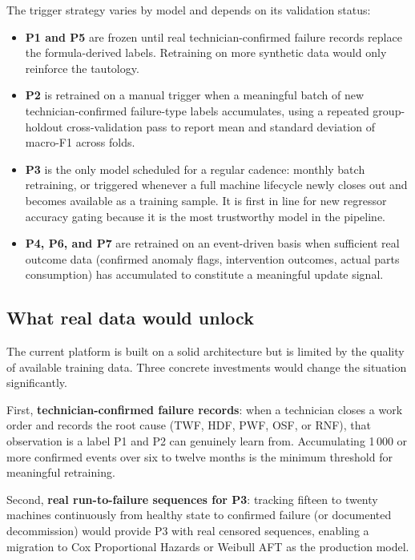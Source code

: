 The trigger strategy varies by model and depends on its validation status:

\begin{itemize}
\item \textbf{P1 and P5} are frozen until real technician-confirmed failure records replace the formula-derived labels. Retraining on more synthetic data would only reinforce the tautology.
\item \textbf{P2} is retrained on a manual trigger when a meaningful batch of new technician-confirmed failure-type labels accumulates, using a repeated group-holdout cross-validation pass to report mean and standard deviation of macro-F1 across folds.
\item \textbf{P3} is the only model scheduled for a regular cadence: monthly batch retraining, or triggered whenever a full machine lifecycle newly closes out and becomes available as a training sample. It is first in line for new regressor accuracy gating because it is the most trustworthy model in the pipeline.
\item \textbf{P4, P6, and P7} are retrained on an event-driven basis when sufficient real outcome data (confirmed anomaly flags, intervention outcomes, actual parts consumption) has accumulated to constitute a meaningful update signal.
\end{itemize}

\subsection{What real data would unlock}

The current platform is built on a solid architecture but is limited by the quality of available training data. Three concrete investments would change the situation significantly.

First, \textbf{technician-confirmed failure records}: when a technician closes a work order and records the root cause (TWF, HDF, PWF, OSF, or RNF), that observation is a label P1 and P2 can genuinely learn from. Accumulating 1\,000 or more confirmed events over six to twelve months is the minimum threshold for meaningful retraining.

Second, \textbf{real run-to-failure sequences for P3}: tracking fifteen to twenty machines continuously from healthy state to confirmed failure (or documented decommission) would provide P3 with real censored sequences, enabling a migration to Cox Proportional Hazards or Weibull AFT as the production model.

